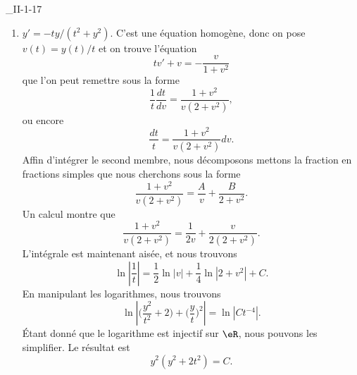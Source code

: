 \begin{corrige}{_II-1-17}
\begin{enumerate}
\item
$y'=-ty/(t^2+y^2)$. C'est une équation homogène, donc on pose $v(t)=y(t)/t$ et on trouve l'équation
\begin{equation}
	tv'+v=-\frac{ v }{ 1+v^2 }
\end{equation}
que l'on peut remettre sous la forme
\begin{equation}
	\frac{1}{ t }\frac{ dt }{ dv }=\frac{ 1+v^2 }{ v(2+v^2) },
\end{equation}
ou encore
\begin{equation}
	\frac{ dt }{ t }=\frac{ 1+v^2 }{ v(2+v^2) }dv.
\end{equation}
Affin d'intégrer le second membre, nous décomposons mettons la fraction en fractions simples que nous cherchons sous la forme
\begin{equation}
	\frac{ 1+v^2 }{ v(2+v^2) }=\frac{ A }{ v }+\frac{ B }{ 2+v^2 }.
\end{equation}
Un calcul montre que
\begin{equation}
	\frac{ 1+v^2 }{ v(2+v^2) }=\frac{ 1 }{ 2v }+\frac{ v }{ 2(2+v^2) }.
\end{equation}
L'intégrale est maintenant aisée, et nous trouvons
\begin{equation}
	\ln\left| \frac{ 1 }{ t } \right| =\frac{ 1 }{2}\ln| v |+\frac{1}{ 4 }\ln| 2+v^2 |+C.
\end{equation}
En manipulant les logarithmes, nous trouvons
\begin{equation}
	\ln\left| \big( \frac{ y^2 }{ t^2 }+2\big)+\big( \frac{ y }{ t } \big)^2  \right|=\ln| Ct^{-4} |.
\end{equation}
Étant donné que le logarithme est injectif sur $\eR$, nous pouvons les simplifier. Le résultat est
\begin{equation}
	y^2(y^2+2t^2)=C.
\end{equation}

\end{enumerate}

\end{corrige}
